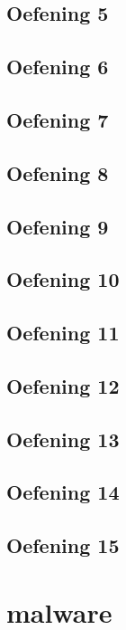 \documentclass[a4paper,11pt]{report}
\begin{document}
\section{Oefening 5}

\section{Oefening 6}

\section{Oefening 7}

\section{Oefening 8}

\section{Oefening 9}

\section{Oefening 10}

\section{Oefening 11}

\section{Oefening 12}

\section{Oefening 13}

\section{Oefening 14}

\section{Oefening 15}

\newpage

\chapter{malware}
\end{document}
